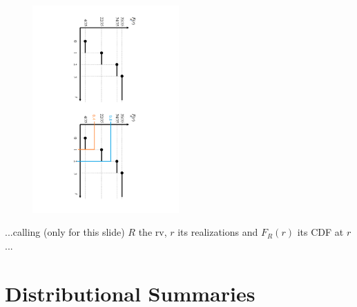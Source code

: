 \documentclass[smaller, handout]{beamer}\usepackage[]{graphicx}\usepackage[]{color}
\begin{document}
\begin{frame}{\secname}


\begin{example} 
  \begin{figure}[h!]
  \centering
  \includegraphics[width=0.5\textwidth,height=0.95\textheight, angle = 90]{img/Quantiles_Discr.pdf}
  \end{figure}
  ...calling (only for this slide) $R$ the rv, $r$ its realizations and $F_R(r)$ its CDF at $r$...
  \end{example}
\end{frame}

\section{Distributional Summaries}
\end{document}

